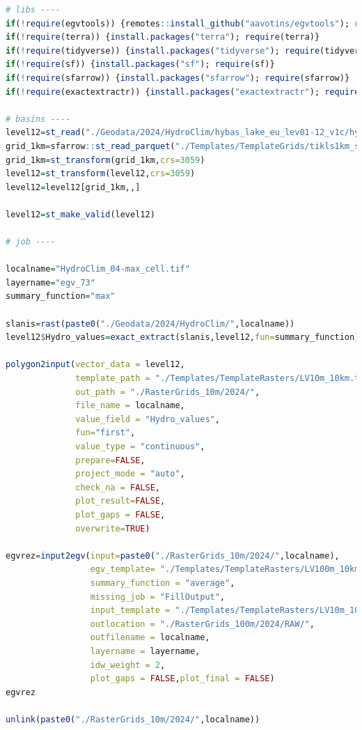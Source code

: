 \documentclass[
]{book}
\begin{document}
\begin{lstlisting}[language=R]
# libs ----
if(!require(egvtools)) {remotes::install_github("aavotins/egvtools"); require(egvtools)}
if(!require(terra)) {install.packages("terra"); require(terra)}
if(!require(tidyverse)) {install.packages("tidyverse"); require(tidyverse)}
if(!require(sf)) {install.packages("sf"); require(sf)}
if(!require(sfarrow)) {install.packages("sfarrow"); require(sfarrow)}
if(!require(exactextractr)) {install.packages("exactextractr"); require(exactextractr)}

# basins ----
level12=st_read("./Geodata/2024/HydroClim/hybas_lake_eu_lev01-12_v1c/hybas_lake_eu_lev12_v1c.shp")
grid_1km=sfarrow::st_read_parquet("./Templates/TemplateGrids/tikls1km_sauzeme.parquet")
grid_1km=st_transform(grid_1km,crs=3059)
level12=st_transform(level12,crs=3059)
level12=level12[grid_1km,,]

level12=st_make_valid(level12)

# job ----

localname="HydroClim_04-max_cell.tif"
layername="egv_73"
summary_function="max"
  
slanis=rast(paste0("./Geodata/2024/HydroClim/",localname))
level12$Hydro_values=exact_extract(slanis,level12,fun=summary_function)
  
polygon2input(vector_data = level12,
              template_path = "./Templates/TemplateRasters/LV10m_10km.tif",
              out_path = "./RasterGrids_10m/2024/",
              file_name = localname,
              value_field = "Hydro_values",
              fun="first",
              value_type = "continuous",
              prepare=FALSE,
              project_mode = "auto",
              check_na = FALSE,
              plot_result=FALSE,
              plot_gaps = FALSE,
              overwrite=TRUE)
  
egvrez=input2egv(input=paste0("./RasterGrids_10m/2024/",localname),
                 egv_template= "./Templates/TemplateRasters/LV100m_10km.tif",
                 summary_function = "average",
                 missing_job = "FillOutput",
                 input_template = "./Templates/TemplateRasters/LV10m_10km.tif",
                 outlocation = "./RasterGrids_100m/2024/RAW/",
                 outfilename = localname,
                 layername = layername,
                 idw_weight = 2,
                 plot_gaps = FALSE,plot_final = FALSE)
egvrez
  
unlink(paste0("./RasterGrids_10m/2024/",localname))
\end{lstlisting}
\end{document}
